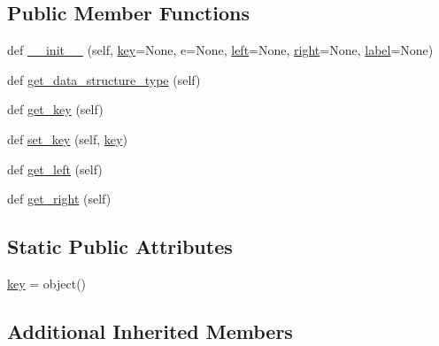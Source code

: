 \subsection*{Public Member Functions}
\begin{DoxyCompactItemize}
\item 
def \mbox{\hyperlink{class_bridges_1_1_b_s_t_element_1_1_b_s_t_element_a029592a6643272b52a3095d4c963b2f4}{\+\_\+\+\_\+init\+\_\+\+\_\+}} (self, \mbox{\hyperlink{class_bridges_1_1_b_s_t_element_1_1_b_s_t_element_a2361f6985c8e968645c57ecdb837d000}{key}}=None, e=None, \mbox{\hyperlink{class_bridges_1_1_bin_tree_element_1_1_bin_tree_element_ae2011efda691620e8c76e366131b0195}{left}}=None, \mbox{\hyperlink{class_bridges_1_1_bin_tree_element_1_1_bin_tree_element_a5130987f56eff4edcc8c8ef323f8cd3d}{right}}=None, \mbox{\hyperlink{class_bridges_1_1_element_1_1_element_a301fe5be8cf72b2c62f6a218feeb9166}{label}}=None)
\item 
def \mbox{\hyperlink{class_bridges_1_1_b_s_t_element_1_1_b_s_t_element_a291061a5223baf43a84616d10a5cfd61}{get\+\_\+data\+\_\+structure\+\_\+type}} (self)
\item 
def \mbox{\hyperlink{class_bridges_1_1_b_s_t_element_1_1_b_s_t_element_ad28d941484956bcae3b4bbfba2c8f8e4}{get\+\_\+key}} (self)
\item 
def \mbox{\hyperlink{class_bridges_1_1_b_s_t_element_1_1_b_s_t_element_a88a0a40bb39e33d5f7d7a75f5f498ea0}{set\+\_\+key}} (self, \mbox{\hyperlink{class_bridges_1_1_b_s_t_element_1_1_b_s_t_element_a2361f6985c8e968645c57ecdb837d000}{key}})
\item 
def \mbox{\hyperlink{class_bridges_1_1_b_s_t_element_1_1_b_s_t_element_aae6923e72c6bede9f8de54cab1104852}{get\+\_\+left}} (self)
\item 
def \mbox{\hyperlink{class_bridges_1_1_b_s_t_element_1_1_b_s_t_element_aa307077e096373b7ebf9ece22eb61c69}{get\+\_\+right}} (self)
\end{DoxyCompactItemize}
\subsection*{Static Public Attributes}
\begin{DoxyCompactItemize}
\item 
\mbox{\hyperlink{class_bridges_1_1_b_s_t_element_1_1_b_s_t_element_a2361f6985c8e968645c57ecdb837d000}{key}} = object()
\end{DoxyCompactItemize}
\subsection*{Additional Inherited Members}


